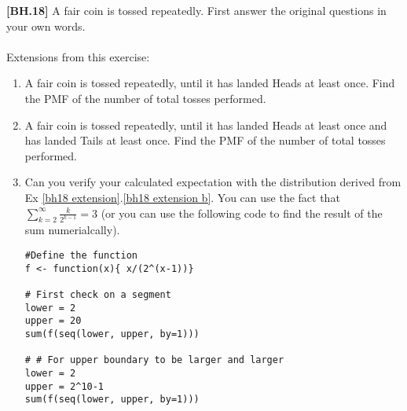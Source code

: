 \begin{exercise}\label{bh18 extension}
	\textbf{[BH.18]} A fair coin is tossed repeatedly. First answer the original questions in your own words.\\~\\
	Extensions from this exercise:
	\begin{enumerate}
		\item\label{bh18 extension a}  A fair coin is tossed repeatedly, until it has landed Heads at least once. Find the PMF of the number of total tosses performed.
		\item\label{bh18 extension b}  A fair coin is tossed repeatedly, until it has landed Heads at least once and has landed Tails at least once. Find the PMF of the number of total tosses performed.
		\item Can you verify your calculated expectation with the distribution derived from Ex \ref{bh18 extension}.\ref{bh18 extension b}. You can use the fact that $\sum_{k = 2}^\infty \frac{k}{2^{k-1}} =3$ (or you can use the following code to find the result of the sum numerialcally).
		\begin{verbatim}
#Define the function
f <- function(x){ x/(2^(x-1))}

# First check on a segment
lower = 2
upper = 20
sum(f(seq(lower, upper, by=1)))

# # For upper boundary to be larger and larger 
lower = 2
upper = 2^10-1
sum(f(seq(lower, upper, by=1)))
		\end{verbatim}
	\end{enumerate}
\end{exercise}